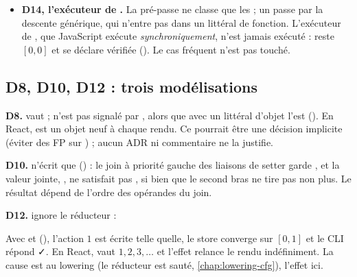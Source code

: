 \begin{itemize}
    un seul saut il vaut $\Top$ (). Ce défaut-là est
    couvert globalement par l'Info \og component  was not
    found\fg{}, qui suspend les vérifications ; la valeur calculée reste
    fausse.
  \item \textbf{D14, l'exécuteur de .} La pré-passe ne
    classe que les  ; un  passe par la descente
    générique, qui n'entre pas dans un littéral de fonction. L'exécuteur de
    , que JavaScript
    exécute \emph{synchroniquement}, n'est jamais exécuté :  reste
    $[0,0]$ et  se déclare vérifiée
    (). Le cas fréquent
     n'est pas touché.
\end{itemize}

\subsection{D8, D10, D12 : trois modélisations}

\textbf{D8.}  vaut  ;
 n'est pas signalé par
, alors que \code{[obj]} avec un littéral
d'objet l'est (). En React,  est un objet
neuf à chaque rendu. Ce pourrait être une décision implicite (éviter des FP
sur ) ; aucun ADR ni commentaire ne la justifie.

\textbf{D10.}  n'écrit que
 () : le join à priorité gauche des liaisons
de setter garde , et la valeur jointe, , ne
satisfait pas , si bien que le second bras ne tire pas
non plus. Le résultat dépend de l'ordre des opérandes du join.

\textbf{D12.}  ignore le réducteur :
Avec  et
 (), l'action
$1$ est écrite telle quelle, le store converge sur $[0,1]$ et le CLI répond
✓. En React,  vaut $1, 2, 3, \ldots$ et l'effet relance le
rendu indéfiniment. La cause est au lowering (le réducteur est sauté,
\cref{chap:lowering-cfg}), l'effet ici.

